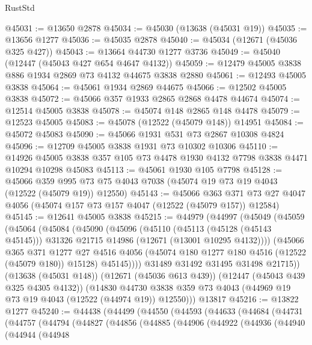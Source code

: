 \begin{lexlean}{RustStd}
\begin{coremodule}
@45031 := @13650 @2878
@45034 := @45030 (@13638 (@45031 @19))
@45035 := @13656 @1277
@45036 := @45035 @2878
@45040 := @45034 (@12671 (@45036 @325 @427))
@45043 := @13664 @44730 @1277 @3736
@45049 := @45040 (@12447 (@45043 @427 @654 @4647 @4132))
@45059 := @12479 @45005 @3838 @886 @1934 @2869 @73 @4132 @44675 @3838 @2880
@45061 := @12493 @45005 @3838
@45064 := @45061 @1934 @2869 @44675
@45066 := @12502 @45005 @3838
@45072 := @45066 @357 @1933 @2865 @2868 @4478 @44674
@45074 := @12514 @45005 @3838
@45078 := @45074 @148 @2865 @148 @4478
@45079 := @12523 @45005
@45083 := @45078 (@12522 (@45079 @148)) @14951
@45084 := @45072 @45083
@45090 := @45066 @1931 @531 @73 @2867 @10308 @4824
@45096 := @12709 @45005 @3838 @1931 @73 @10302 @10306
@45110 := @14926 @45005 @3838 @357 @105 @73 @4478 @1930 @4132 @7798 @3838 @4471 @10294 @10298 @45083
@45113 := @45061 @1930 @105 @7798
@45128 := @45066
    @359
    @995
    @73
    @75
    @4043
    @7038
    (@45074 @19 @73 @19 @4043 (@12522 (@45079 @19)) @12550)
@45143 := @45066
    @363
    @371
    @73
    @27
    @4047
    @4056
    (@45074 @157 @73 @157 @4047 (@12522 (@45079 @157)) @12584)
@45145 := @12641 @45005 @3838
@45215 := @44979
    (@44997
      (@45049
        (@45059
          (@45064
            (@45084
              (@45090
                (@45096
                  (@45110
                    (@45113 (@45128 (@45143 @45145)))
                    @31326
                    @21715
                    @14986
                    (@12671 (@13001 @10295 @4132))))
                (@45066
                  @365
                  @371
                  @1277
                  @27
                  @4516
                  @4056
                  (@45074 @180 @1277 @180 @4516 (@12522 (@45079 @180)) @15128)
                  @45145))))
          @31489
          @31492
          @31495
          @31498
          @21715))
      (@13638 (@45031 @148))
      (@12671 (@45036 @613 @439))
      (@12447 (@45043 @439 @325 @4305 @4132))
      (@14830 @44730 @3838 @359 @73 @4043 (@44969 @19 @73 @19 @4043 (@12522 (@44974 @19)) @12550)))
    @13817
@45216 := @13822 @1277
@45240 := @44438
    (@44499
      (@44550
        (@44593
          (@44633
            (@44684
              (@44731
                (@44757
                  (@44794
                    (@44827
                      (@44856
                        (@44885
                          (@44906
                            (@44922
                              (@44936
                                (@44940
                                  (@44944
                                    (@44948

\end{coremodule}
\end{lexlean}
